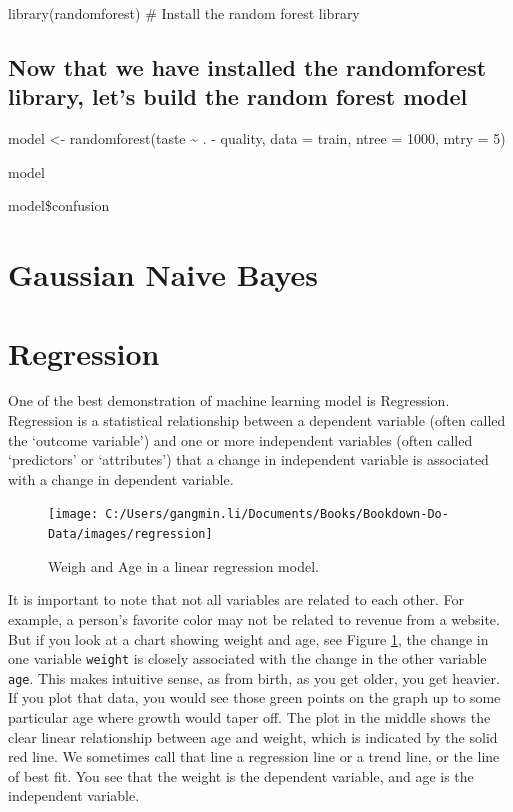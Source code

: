 \documentclass[
]{book}
\begin{document}
library(randomforest) \# Install the random forest library

\hypertarget{now-that-we-have-installed-the-randomforest-library-lets-build-the-random-forest-model}{%
\subsection{Now that we have installed the randomforest library, let's build the random forest model}\label{now-that-we-have-installed-the-randomforest-library-lets-build-the-random-forest-model}}

model \textless- randomforest(taste \textasciitilde{} . - quality, data = train, ntree = 1000, mtry = 5)

model

model\$confusion

\hypertarget{gaussian-naive-bayes}{%
\section{Gaussian Naive Bayes}\label{gaussian-naive-bayes}}

\hypertarget{regression}{%
\section{Regression}\label{regression}}

One of the best demonstration of machine learning model is Regression. Regression is a statistical relationship between a dependent variable (often called the `outcome variable') and one or more independent variables (often called `predictors' or `attributes') that a change in independent variable is associated with a change in dependent variable.

\begin{figure}

{\centering \texttt{[image: C:/Users/gangmin.li/Documents/Books/Bookdown-Do-Data/images/regression]} 

}

\caption{Weigh and Age in a linear regression model.}\label{fig:regression}
\end{figure}

It is important to note that not all variables are related to each other. For example, a person's favorite color may not be related to revenue from a website. But if you look at a chart showing weight and age, see Figure \ref{fig:regression}, the change in one variable \texttt{weight} is closely associated with the change in the other variable \texttt{age}. This makes intuitive sense, as from birth, as you get older, you get heavier. If you plot that data, you would see those green points on the graph up to some particular age where growth would taper off. The plot in the middle shows the clear linear relationship between age and weight, which is indicated by the solid red line. We sometimes call that line a regression line or a trend line, or the line of best fit. You see that the weight is the dependent variable, and age is the independent variable.
\end{document}
